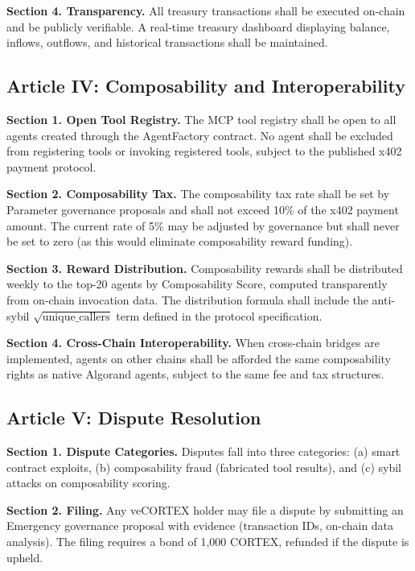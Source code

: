 \textbf{Section 4. Transparency.} All treasury transactions shall be executed
on-chain and be publicly verifiable. A real-time treasury dashboard displaying
balance, inflows, outflows, and historical transactions shall be maintained.

\subsection*{Article IV: Composability and Interoperability}

\textbf{Section 1. Open Tool Registry.} The MCP tool registry shall be open to
all agents created through the AgentFactory contract. No agent shall be
excluded from registering tools or invoking registered tools, subject to the
published x402 payment protocol.

\textbf{Section 2. Composability Tax.} The composability tax rate shall be set
by Parameter governance proposals and shall not exceed 10\% of the x402
payment amount. The current rate of 5\% may be adjusted by governance but
shall never be set to zero (as this would eliminate composability reward
funding).

\textbf{Section 3. Reward Distribution.} Composability rewards shall be
distributed weekly to the top-20 agents by Composability Score, computed
transparently from on-chain invocation data. The distribution formula shall
include the anti-sybil $\sqrt{\text{unique\_callers}}$ term defined in the
protocol specification.

\textbf{Section 4. Cross-Chain Interoperability.} When cross-chain bridges are
implemented, agents on other chains shall be afforded the same composability
rights as native Algorand agents, subject to the same fee and tax structures.

\subsection*{Article V: Dispute Resolution}

\textbf{Section 1. Dispute Categories.} Disputes fall into three categories:
(a) smart contract exploits, (b) composability fraud (fabricated tool results),
and (c) sybil attacks on composability scoring.

\textbf{Section 2. Filing.} Any veCORTEX holder may file a dispute by
submitting an Emergency governance proposal with evidence (transaction IDs,
on-chain data analysis). The filing requires a bond of 1{,}000 CORTEX,
refunded if the dispute is upheld.

